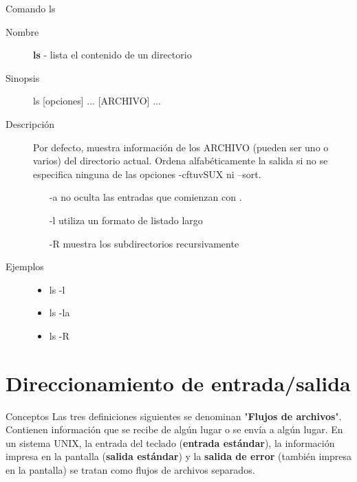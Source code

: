 \begin{frame}[c]{Comando ls}
  \begin{description}
    \item[Nombre]
      \textbf{ls} - lista el contenido de un directorio

    \vspace{\baselineskip}
    \item[Sinopsis]
      ls [opciones] ... [ARCHIVO] ...

    \vspace{\baselineskip}
    \item[Descripción]
      Por  defecto,  muestra  información de los ARCHIVO (pueden ser uno o
      varios) del directorio actual. Ordena alfabéticamente la salida si no
      se especifica ninguna de las opciones -cftuvSUX ni --sort.

      \begin{itemize}
        \item [-a] no oculta las entradas que comienzan con .
        \item [-l] utiliza un formato de listado largo
        \item [-R] muestra los subdirectorios recursivamente
      \end{itemize}

    \vspace{\baselineskip}
    \item[Ejemplos]
      \begin{itemize}
        \item ls -l
        \item ls -la
        \item ls -R
      \end{itemize}
  \end{description}
\end{frame}

\section{Direccionamiento de entrada/salida}

\begin{frame}[c]{Conceptos}
  Las tres definiciones siguientes se denominan "\textbf{Flujos de archivos}".
  Contienen información que se recibe de algún lugar o se envía a algún lugar.
  En un sistema UNIX, la entrada del teclado (\textbf{entrada estándar}),
  la información impresa en la pantalla (\textbf{salida estándar}) y la
  \textbf{salida de error} (también impresa en la pantalla) se tratan como
  flujos de archivos separados.
\end{frame}

